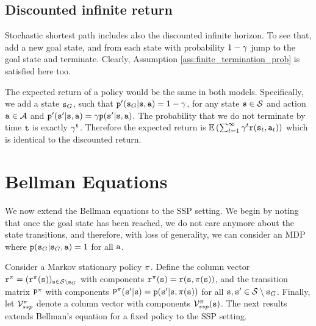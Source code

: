 \subsection{Discounted infinite return}

Stochastic shortest path includes also the discounted infinite
horizon. To see that, add a new goal state, and from each state with
probability $1-\gamma$ jump to the goal state and terminate. Clearly, Assumption \ref{ass:finite_termination_prob} is satisfied here too. 

The expected return of a policy would be the same in both models.
Specifically, we add a state ${\tt s}_G$, such that
${\tt p}'({\tt s}_G|{\tt s},{\tt a})=1-\gamma$, for any state
${\tt s}\in\mathcal{S}$ and action ${\tt a}\in\mathcal{A}$ and
${\tt p}'({\tt s}'|{\tt s},{\tt a})=\gamma {\tt p}({\tt s}'|{\tt s},{\tt a})$. The
probability that we do not terminate by time ${\tt t}$ is exactly
$\gamma^{\tt t}$. Therefore the expected return is
$\mathbb{E}\left(\sum_{t=1}^\infty \gamma^t{\tt r}({\tt s}_t,{\tt a}_t)\right)$ which is
identical to the discounted return.





\section{Bellman Equations}\label{sec:ssp-bellman}

We now extend the Bellman equations to the SSP setting. We begin by noting that once the goal state has been reached, we do not care anymore about the state transitions, and therefore, with loss of generality, we can consider an MDP where ${\tt p}({\tt s}_G|{\tt s}_G,{\tt a}) = 1$ for all ${\tt a}$. 

Consider a Markov stationary policy $\pi$. Define the column vector ${{\tt r}^\pi } =
{({{\tt r}^\pi }({\tt s}))_{{\tt s} \in \mathcal{S} \setminus {\tt s}_G}}$ with components
${{\tt r}^\pi }({\tt s}) = {\tt r}({\tt s},\pi ({\tt s}))$, and the
transition matrix ${{\tt P}^\pi }$ with components ${{\tt P}^\pi
}({\tt s}'|{\tt s}) = {\tt p}({\tt s}'|{\tt s},\pi ({\tt s}))$ for all ${\tt s},{\tt s}' \in \mathcal{S} \setminus {\tt s}_G$. Finally,
let ${\mathcal{V}_{ssp}^\pi }$ denote a column vector with components
${\mathcal{V}_{ssp}^\pi }({\tt s})$. The next results extends Bellman's equation for a fixed policy to the SSP setting.



